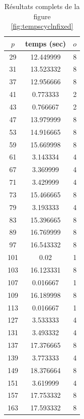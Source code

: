 \documentclass[a4paper]{article} %
\numberwithin{section}{part}
\numberwithin{equation}{section}
\begin{document}
\begin{table}[H]
\centering
\begin{tabular}{|c|c|c|}
\hline
$p$ & temps (sec)& $o$\\
\hline
\hline
29 &12.449999& 8\\
\hline
31 &13.523332& 8\\
\hline
37 &12.956666& 8\\
\hline
41 &0.773333& 2\\
\hline
43 &0.766667& 2\\
\hline
47 &13.979999& 8\\
\hline
53 &14.916665 &8\\
\hline
59 &15.669998 &8\\
\hline
61 &3.143334& 4\\
\hline
67 &3.369999& 4\\
\hline
71 &3.429999 &4\\
\hline
73 &15.466665 &8\\
\hline
79 &3.193333& 4\\
\hline
83 &15.396665& 8\\
\hline
89 &16.769999& 8\\
\hline
97 &16.543332& 8\\
\hline
101& 0.02& 1\\
\hline
103& 16.123331& 8\\
\hline
107& 0.016667 &1\\
\hline
109& 16.189998& 8\\
\hline
113& 0.016667 &1\\
\hline
127& 3.533333 &4\\
\hline
131& 3.493332 &4\\
\hline
137& 17.376665& 8\\
\hline
139& 3.773333 &4\\
\hline
149& 18.376664& 8\\
\hline
151& 3.619999 &4\\
\hline
157& 17.753332& 8\\
\hline
163& 17.593332& 8\\
\hline
\end{tabular}
\caption{Résultats complets de la figure \ref{fig:tempscyclnfixed}}
\end{table}
\end{document}
